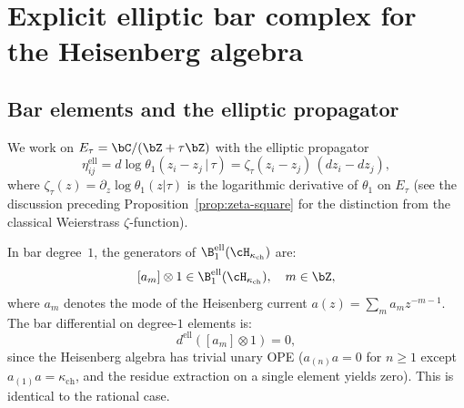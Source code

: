 \section{Explicit elliptic bar complex for the Heisenberg algebra}
\label{sec:elliptic-bar-heisenberg}

\subsection{Bar elements and the elliptic propagator}
\label{subsec:elliptic-bar-elements}

We work on $E_\tau = \bC / (\bZ + \tau\bZ)$ with the elliptic
propagator
\begin{equation}\label{eq:ell-propagator}
\eta_{ij}^{\mathrm{ell}}
= d\log\theta_1(z_i - z_j \,|\, \tau)
= \zeta_\tau(z_i - z_j)\,(dz_i - dz_j),
\end{equation}
where $\zeta_\tau(z) = \partial_z \log\theta_1(z|\tau)$ is the
logarithmic derivative of $\theta_1$ on $E_\tau$
(see the discussion preceding Proposition~\ref{prop:zeta-square}
for the distinction from the classical Weierstrass
$\zeta$-function).

\begin{computation}\label{comp:ell-bar-deg1}
In bar degree~$1$, the generators of $\B^{\mathrm{ell}}_1(\cH_{\kappa_{\mathrm{ch}}})$
are:
\[
[a_m] \otimes 1 \in \B^{\mathrm{ell}}_1(\cH_{\kappa_{\mathrm{ch}}}), \quad m \in \bZ,
\]
where $a_m$ denotes the mode of the Heisenberg current $a(z) = \sum_m a_m z^{-m-1}$.
The bar differential on degree-$1$ elements is:
\[
d^{\mathrm{ell}}([a_m] \otimes 1) = 0,
\]
since the Heisenberg algebra has trivial unary OPE
($a_{(n)}a = 0$ for $n \geq 1$ except $a_{(1)}a = \kappa_{\mathrm{ch}}$, and
the residue extraction on a single element yields zero).
This is identical to the rational case.
\end{computation}

